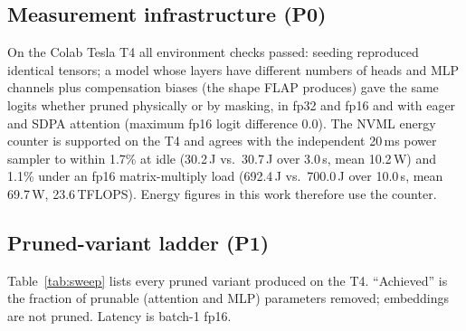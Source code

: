 \subsection{Measurement infrastructure (P0)}
On the Colab Tesla T4 all environment checks passed: seeding reproduced identical tensors; a model whose layers have different numbers of heads and MLP channels plus compensation biases (the shape FLAP produces) gave the same logits whether pruned physically or by masking, in fp32 and fp16 and with eager and SDPA attention (maximum fp16 logit difference 0.0). The NVML energy counter is supported on the T4 and agrees with the independent 20\,ms power sampler to within 1.7\% at idle (30.2\,J vs.\ 30.7\,J over 3.0\,s, mean 10.2\,W) and 1.1\% under an fp16 matrix-multiply load (692.4\,J vs.\ 700.0\,J over 10.0\,s, mean 69.7\,W, 23.6\,TFLOPS). Energy figures in this work therefore use the counter.

\subsection{Pruned-variant ladder (P1)}
Table~\ref{tab:sweep} lists every pruned variant produced on the T4. ``Achieved'' is the fraction of prunable (attention and MLP) parameters removed; embeddings are not pruned. Latency is batch-1 fp16.

